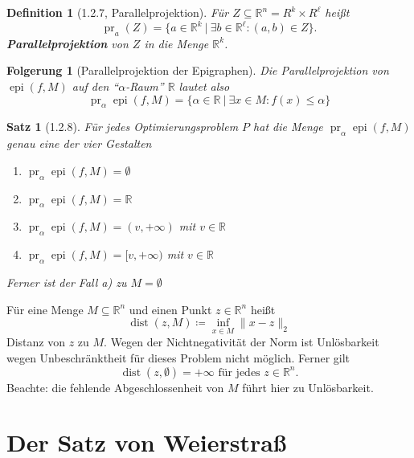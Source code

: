 \documentclass[12pt]{extreport} %
\newcommand{\R}{\mathbb{R}}
\theoremstyle{named}
\theoremstyle{nnamed}
\theoremstyle{itshape}
\newtheorem*{satz}{Satz}
\newtheorem*{definition}{Definition}
\theoremstyle{normal}
\newtheorem*{folgerung}{Folgerung}
\begin{document}
\begin{definition}[1.2.7, Parallelprojektion]
	Für $Z \subseteq \R^n = R^k \times R^\ell$ heißt
	$$ \operatorname{pr}_a(Z) = \big\{ a \in \R^k ~|~\exists b \in \R^\ell \colon (a, b) \in Z \big\}. $$
	\textbf{Parallelprojektion} von $Z$ in die Menge $\R^k$.
\end{definition}

\begin{folgerung}[Parallelprojektion der Epigraphen]
	Die Parallelprojektion von $\operatorname{epi}(f, M)$ auf den \enquote{$\alpha$-Raum} $\R$ lautet also
	$$ \operatorname{pr}_\alpha \operatorname{epi}(f, M) = \big\{ \alpha \in \R ~|~\exists x \in M: f(x) \leq \alpha \big\} $$
\end{folgerung}

\begin{satz}[1.2.8]
	Für jedes Optimierungsproblem $P$ hat die Menge $\operatorname{pr}_{\alpha} \operatorname{epi}(f, M)$ genau eine der vier Gestalten
	\begin{enumerate}
		\item $\operatorname{pr}_{\alpha} \operatorname{epi}(f, M) = \emptyset$
		\item $\operatorname{pr}_{\alpha} \operatorname{epi}(f, M) = \R$
		\item $\operatorname{pr}_{\alpha} \operatorname{epi}(f, M) = (v, +\infty)$ mit $v \in \R$
		\item $\operatorname{pr}_{\alpha} \operatorname{epi}(f, M) = [v, +\infty)$ mit $v \in \R$
	\end{enumerate}
	Ferner ist der Fall a) zu $M =\emptyset$ %
\end{satz}

\begin{beispiel}
	Für eine Menge $M \subseteq \R^n$ und einen Punkt $z \in \R^n$ heißt
	$$ \operatorname{dist}(z, M) \coloneqq \inf_{x \in M} \| x - z \|_2 $$	
	Distanz von $z$ zu $M$. Wegen der Nichtnegativität der Norm ist Unlösbarkeit wegen Unbeschränktheit für dieses Problem nicht möglich. Ferner gilt 
	$$ \operatorname{dist}(z, \emptyset) = +\infty \text{ für jedes } z \in \R^n. $$
	Beachte: die fehlende Abgeschlossenheit von $M$ führt hier zu Unlösbarkeit.
\end{beispiel}

\newpage

\section{Der Satz von Weierstraß}
\end{document}
